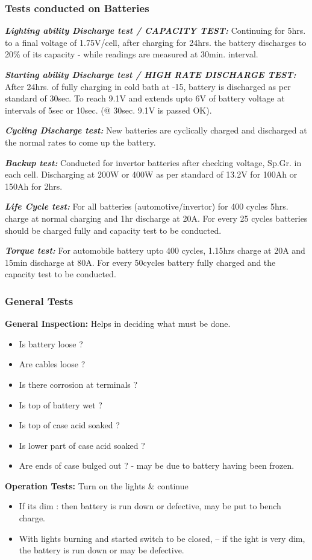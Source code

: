 \documentclass{beamer}
\begin{document}
\begin{frame}
  \frametitle{Tests conducted on Batteries}
  \fontsize{7pt}{10}\selectfont
  \textbf{\textit{Lighting ability Discharge test / CAPACITY TEST:}} Continuing for 5hrs. to a final voltage of 1.75V/cell, after charging for 24hrs. the battery discharges to 20\% of its 
  capacity - while readings are measured at 30min. interval.

  \bigskip
  \textbf{\textit{Starting ability Discharge test / HIGH RATE DISCHARGE TEST:}} After 24hrs. of fully charging in cold bath at -15\textcelsius, battery is discharged as per standard of 30sec. To 
  reach 9.1V and extends upto 6V of battery voltage at intervals of 5sec or 10sec. (@ 30sec. 9.1V is passed OK).
  
  \bigskip
  \textbf{\textit{Cycling Discharge test:}} New batteries are cyclically charged and discharged at the normal rates to come up the battery.
  
  \bigskip
  \textbf{\textit{Backup test:}} Conducted for invertor batteries after checking voltage, Sp.Gr. in each cell. Discharging at 200W or 400W as per standard of 13.2V for 100Ah or 150Ah for 
  2hrs.
  
  \bigskip
  \textbf{\textit{Life Cycle test:}} For all batteries (automotive/invertor) for 400 cycles 5hrs. charge at normal charging and 1hr discharge at 20A. For every 25 cycles batteries should
  be charged fully and capacity test to be conducted.
  
  \bigskip
  \textbf{\textit{Torque test:}} For automobile battery upto 400 cycles, 1.15hrs charge at 20A and 15min discharge at 80A. For every 50cycles battery fully charged and the capacity test 
  to be conducted.
\end{frame}

\begin{frame}
  \frametitle{General Tests}
  \fontsize{8pt}{12}\selectfont
  
  \textbf{General Inspection:} Helps in deciding what must be done.
  \begin{itemize}
    \item Is battery loose ?
    \item Are cables loose ?
    \item Is there corrosion at terminals ?
    \item Is top of battery wet ?
    \item Is top of case acid soaked ?
    \item Is lower part of case acid soaked ?
    \item Are ends of case bulged out ? - may be due to battery having been frozen.
  \end{itemize}
  
  \bigskip
  \textbf{Operation Tests:} Turn on the lights \& continue
  \begin{itemize}
    \item If its dim : then battery is run down or defective, may be put to bench charge.
    \item With lights burning and started switch to be closed, -- if the ight is very dim, the battery is run down or may be defective.
  \end{itemize}
\end{frame}
\end{document}
